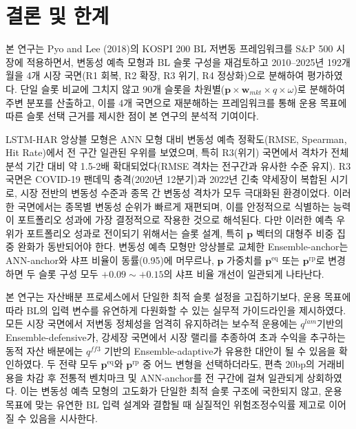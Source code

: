 \documentclass{article}
\begin{document}
\section{결론 및 한계}\label{sec:conclusion}

본 연구는 Pyo and Lee (2018)의 KOSPI 200 BL 저변동 프레임워크를 S\&P 500 시장에 적용하면서, 변동성 예측 모형과 BL 슬롯 구성을 재검토하고 2010--2025년 192개월을 4개 시장 국면(R1 회복, R2 확장, R3 위기, R4 정상화)으로 분해하여 평가하였다. 단일 슬롯 비교에 그치지 않고 90개 슬롯을 차원별($\mathbf{p} \times \mathbf{w}_{mkt} \times q \times \omega$)로 분해하여 주변 분포를 산출하고, 이를 4개 국면으로 재분해하는 프레임워크를 통해 운용 목표에 따른 슬롯 선택 근거를 제시한 점이 본 연구의 분석적 기여이다.

LSTM-HAR 앙상블 모형은 ANN 모형 대비 변동성 예측 정확도(RMSE, Spearman, Hit Rate)에서 전 구간 일관된 우위를 보였으며, 특히 R3(위기) 국면에서 격차가 전체 분석 기간 대비 약 1.5-2배 확대되었다(RMSE 격차는 전구간과 유사한 수준 유지). R3 국면은 COVID-19 팬데믹 충격(2020년 1\textendash 2분기)과 2022년 긴축 약세장이 복합된 시기로, 시장 전반의 변동성 수준과 종목 간 변동성 격차가 모두 극대화된 환경이었다. 이러한 국면에서는 종목별 변동성 순위가 빠르게 재편되며, 이를 안정적으로 식별하는 능력이 포트폴리오 성과에 가장 결정적으로 작용한 것으로 해석된다. 다만 이러한 예측 우위가 포트폴리오 성과로 전이되기 위해서는 슬롯 설계, 특히 $\mathbf{p}$ 벡터의 대형주 비중 집중 완화가 동반되어야 한다. 변동성 예측 모형만 앙상블로 교체한 Ensemble-anchor는 ANN-anchor와 샤프 비율이 동률(0.95)에 머무르나, $\mathbf{p}$ 가중치를 $\mathbf{p}^{\mathrm{eq}}$ 또는 $\mathbf{p}^{\mathrm{rp}}$로 변경하면 두 슬롯 구성 모두 $+0.09 \sim +0.15$의 샤프 비율 개선이 일관되게 나타난다.

본 연구는 자산배분 프로세스에서 단일한 최적 슬롯 설정을 고집하기보다, 운용 목표에 따라 BL의 입력 변수를 유연하게 다원화할 수 있는 실무적 가이드라인을 제시하였다. 모든 시장 국면에서 저변동 정체성을 엄격히 유지하려는 보수적 운용에는 $q^{lam}$‬기반의 Ensemble-defensive가, 강세장 국면에서 시장 랠리를 추종하여 초과 수익을 추구하는 동적 자산 배분에는 $q^{ff3}$‬ 기반의 Ensemble-adaptive가 유용한 대안이 될 수 있음을 확인하였다. 두 전략 모두 $\mathbf{p}^{\mathrm{eq}}$와 $\mathbf{p}^{\mathrm{rp}}$‬ 중 어느 변형을 선택하더라도, 편측 20bp의 거래비용을 차감 후 전통적 벤치마크 및 ANN-anchor를 전 구간에 걸쳐 일관되게 상회하였다. 이는 변동성 예측 모형의 고도화가 단일한 최적 슬롯 구조에 국한되지 않고, 운용 목표에 맞는 유연한 BL 입력 설계와 결합될 때 실질적인 위험조정수익률 제고로 이어질 수 있음을 시사한다.
\end{document}
